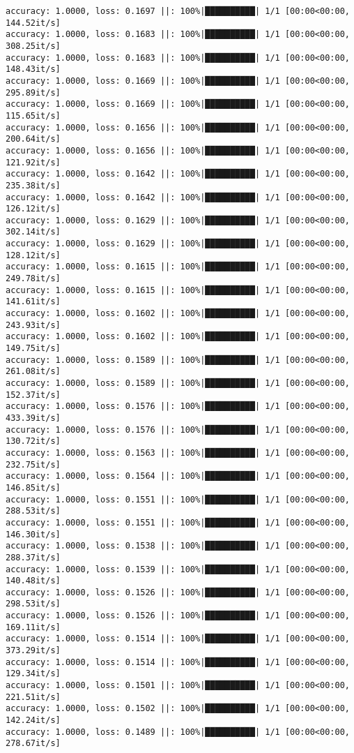 \documentclass[
]{article}
\begin{document}
\begin{verbatim}
accuracy: 1.0000, loss: 0.1697 ||: 100%|██████████| 1/1 [00:00<00:00, 144.52it/s]
accuracy: 1.0000, loss: 0.1683 ||: 100%|██████████| 1/1 [00:00<00:00, 308.25it/s]
accuracy: 1.0000, loss: 0.1683 ||: 100%|██████████| 1/1 [00:00<00:00, 148.43it/s]
accuracy: 1.0000, loss: 0.1669 ||: 100%|██████████| 1/1 [00:00<00:00, 295.89it/s]
accuracy: 1.0000, loss: 0.1669 ||: 100%|██████████| 1/1 [00:00<00:00, 115.65it/s]
accuracy: 1.0000, loss: 0.1656 ||: 100%|██████████| 1/1 [00:00<00:00, 200.64it/s]
accuracy: 1.0000, loss: 0.1656 ||: 100%|██████████| 1/1 [00:00<00:00, 121.92it/s]
accuracy: 1.0000, loss: 0.1642 ||: 100%|██████████| 1/1 [00:00<00:00, 235.38it/s]
accuracy: 1.0000, loss: 0.1642 ||: 100%|██████████| 1/1 [00:00<00:00, 126.12it/s]
accuracy: 1.0000, loss: 0.1629 ||: 100%|██████████| 1/1 [00:00<00:00, 302.14it/s]
accuracy: 1.0000, loss: 0.1629 ||: 100%|██████████| 1/1 [00:00<00:00, 128.12it/s]
accuracy: 1.0000, loss: 0.1615 ||: 100%|██████████| 1/1 [00:00<00:00, 249.78it/s]
accuracy: 1.0000, loss: 0.1615 ||: 100%|██████████| 1/1 [00:00<00:00, 141.61it/s]
accuracy: 1.0000, loss: 0.1602 ||: 100%|██████████| 1/1 [00:00<00:00, 243.93it/s]
accuracy: 1.0000, loss: 0.1602 ||: 100%|██████████| 1/1 [00:00<00:00, 149.75it/s]
accuracy: 1.0000, loss: 0.1589 ||: 100%|██████████| 1/1 [00:00<00:00, 261.08it/s]
accuracy: 1.0000, loss: 0.1589 ||: 100%|██████████| 1/1 [00:00<00:00, 152.37it/s]
accuracy: 1.0000, loss: 0.1576 ||: 100%|██████████| 1/1 [00:00<00:00, 433.39it/s]
accuracy: 1.0000, loss: 0.1576 ||: 100%|██████████| 1/1 [00:00<00:00, 130.72it/s]
accuracy: 1.0000, loss: 0.1563 ||: 100%|██████████| 1/1 [00:00<00:00, 232.75it/s]
accuracy: 1.0000, loss: 0.1564 ||: 100%|██████████| 1/1 [00:00<00:00, 146.85it/s]
accuracy: 1.0000, loss: 0.1551 ||: 100%|██████████| 1/1 [00:00<00:00, 288.53it/s]
accuracy: 1.0000, loss: 0.1551 ||: 100%|██████████| 1/1 [00:00<00:00, 146.30it/s]
accuracy: 1.0000, loss: 0.1538 ||: 100%|██████████| 1/1 [00:00<00:00, 288.37it/s]
accuracy: 1.0000, loss: 0.1539 ||: 100%|██████████| 1/1 [00:00<00:00, 140.48it/s]
accuracy: 1.0000, loss: 0.1526 ||: 100%|██████████| 1/1 [00:00<00:00, 298.53it/s]
accuracy: 1.0000, loss: 0.1526 ||: 100%|██████████| 1/1 [00:00<00:00, 169.11it/s]
accuracy: 1.0000, loss: 0.1514 ||: 100%|██████████| 1/1 [00:00<00:00, 373.29it/s]
accuracy: 1.0000, loss: 0.1514 ||: 100%|██████████| 1/1 [00:00<00:00, 129.34it/s]
accuracy: 1.0000, loss: 0.1501 ||: 100%|██████████| 1/1 [00:00<00:00, 221.51it/s]
accuracy: 1.0000, loss: 0.1502 ||: 100%|██████████| 1/1 [00:00<00:00, 142.24it/s]
accuracy: 1.0000, loss: 0.1489 ||: 100%|██████████| 1/1 [00:00<00:00, 278.67it/s]

\end{verbatim}
\end{document}
